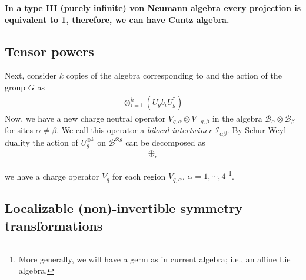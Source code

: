 \documentclass{article}
\newcommand{\mB}{\mathcal{B}}
\theoremstyle{definition}
\begin{document}

{\bf In a type III (purely infinite) von Neumann algebra every projection is equivalent to 1, therefore, we can have Cuntz algebra.}

\subsection{Tensor powers}

Next, consider $k$ copies of the algebra corresponding to  and the action of the group $G$ as
\begin{align}
    \otimes_{i=1}^k (U_g b_i U_g^\dagger)
\end{align}
Now, we have a new charge neutral operator $V_{q,\alpha}\otimes V_{-q,\beta}$ in the algebra $\mB_\alpha\otimes \mB_\beta$ for sites $\alpha\neq \beta$. We call this operator a {\it bilocal intertwiner} $\mathcal{I}_{\alpha\beta}$. By Schur-Weyl duality the action of $U_g^{\otimes k}$ on $\mathcal{B}^{\otimes g}$ can be decomposed as 
\begin{align}
    \oplus_r 
\end{align}

we have a charge operator $V_q$ for each region $V_{q,\alpha}$, $\alpha=1,\cdots, 4$ \footnote{More generally, we will have a germ as in current algebra; i.e., an affine Lie algebra.}. 

  \subsection{Localizable (non)-invertible symmetry transformations}
\end{document}
